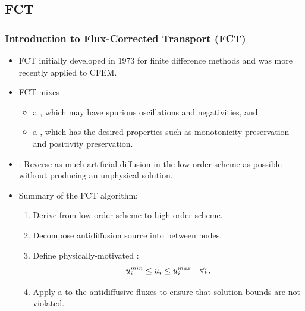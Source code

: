 \subsection{FCT}
\begin{frame}
\frametitle{Introduction to Flux-Corrected Transport (FCT)}

\begin{itemize}
   \item FCT initially developed in 1973 for finite difference methods
      and was more recently applied to CFEM.
   \item FCT mixes
     \begin{itemize}
       \item a , which may have spurious
         oscillations and negativities, and
       \item a , which has the desired properties
         such as monotonicity preservation and positivity preservation.
     \end{itemize}
   \item {}: Reverse as much artificial diffusion in the
     low-order scheme as possible without producing an unphysical solution.
   \item Summary of the FCT algorithm:
     \begin{enumerate}
       \item Derive  from low-order scheme to high-order
         scheme.
       \item Decompose antidiffusion source into  between nodes.
       \item Define physically-motivated :
         \begin{equation}
           u^{min}_i \leq u_i \leq u^{max}_i \quad \forall i \,.
         \end{equation}
       \item Apply a  to the antidiffusive fluxes to ensure
         that solution bounds are not violated.
     \end{enumerate}
\end{itemize}

\end{frame}
